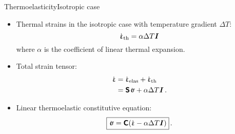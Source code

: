\begin{frame}{Thermoelasticity}{Isotropic case}

\begin{itemize}
\item Thermal strains in the isotropic case with temperature gradient $\Delta T$:
\begin{displaymath}
\strain_\text{th}=\alpha\Delta T\Id
\end{displaymath}
where $\alpha$ is the coefficient of linear thermal expansion.
\item Total strain tensor:
\begin{displaymath}
\begin{split}
\strain &=\strain_\text{elas}+\strain_\text{th} \\
&=\tenscomp\stress+\alpha\Delta T\Id\,.
\end{split}
\end{displaymath}
\item Linear thermoelastic constitutive equation:
\begin{displaymath}
\boxed{\stress=\tenselas(\strain-\alpha\Delta T\Id)}\,.
\end{displaymath}
\end{itemize}

\end{frame}